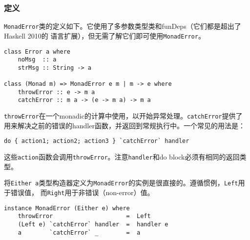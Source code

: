 \subsubsection{定义}
\indent{}\texttt{MonadError}类的定义如下。它使用了多参数类型类和funDeps（它们都是超出了Haskell 2010的
语言扩展），但无需了解它们即可使用\texttt{MonadError}。
\begin{verbatim}
class Error a where
    noMsg  :: a
    strMsg :: String -> a

class (Monad m) => MonadError e m | m -> e where
    throwError :: e -> m a
    catchError :: m a -> (e -> m a) -> m a
\end{verbatim}
\noindent{}\texttt{throwError}在一个monadic的计算中使用，以开始异常处理。\texttt{catchError}提供了
用来解决之前的错误的handler函数，并返回到常规执行中。一个常见的用法是：
\begin{verbatim}
do { action1; action2; action3 } `catchError` handler
\end{verbatim}
\noindent{}这些\texttt{action}函数会调用\texttt{throwError}。注意\texttt{handler}和do block必须有相同的返回类型。

\indent{}将\texttt{Either a}类型构造器定义为\texttt{MonadError}的实例是很直接的。遵循惯例，\texttt{Left}用于错误值，
而\texttt{Right}用于非错误（non-error）值。
\begin{verbatim}
instance MonadError (Either e) where
    throwError                     =  Left
    (Left e) `catchError` handler  =  handler e
    a        `catchError` _        =  a
\end{verbatim}

